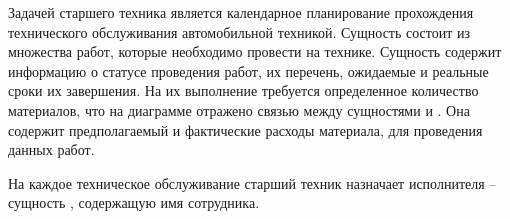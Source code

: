 \documentclass[../nirs.tex]{subfiles}
\begin{document}
Задачей старшего техника является календарное планирование прохождения
технического обслуживания автомобильной техникой. Сущность  состоит из множества работ, которые необходимо провести на
технике. Сущность  содержит информацию о
статусе проведения работ, их перечень, ожидаемые и реальные сроки их завершения.
На их выполнение требуется определенное количество материалов, что на диаграмме
отражено связью между сущностями  и
. Она содержит предполагаемый и фактические расходы
материала, для проведения данных работ.

На каждое техническое обслуживание старший техник назначает исполнителя --
сущность , содержащую имя сотрудника.
\end{document}
